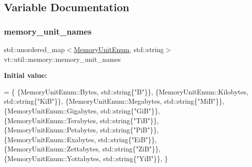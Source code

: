 \subsection{Variable Documentation}
\mbox{\label{namespacevt_1_1util_1_1memory_aa772e07fd4860ed4086654c53eed51c2}} 
\subsubsection{\texorpdfstring{memory\+\_\+unit\+\_\+names}{memory\_unit\_names}}
{\footnotesize\ttfamily std\+::unordered\+\_\+map$<$\hyperlink{namespacevt_1_1util_1_1memory_a64df3d84293b34009f78e2a1db2f9bb6}{Memory\+Unit\+Enum}, std\+::string$>$ vt\+::util\+::memory\+::memory\+\_\+unit\+\_\+names}

{\bfseries Initial value\+:}
\begin{DoxyCode}
= \{
  \{MemoryUnitEnum::Bytes,      std::string\{\textcolor{stringliteral}{"B"}\}\},
  \{MemoryUnitEnum::Kilobytes,  std::string\{\textcolor{stringliteral}{"KiB"}\}\},
  \{MemoryUnitEnum::Megabytes,  std::string\{\textcolor{stringliteral}{"MiB"}\}\},
  \{MemoryUnitEnum::Gigabytes,  std::string\{\textcolor{stringliteral}{"GiB"}\}\},
  \{MemoryUnitEnum::Terabytes,  std::string\{\textcolor{stringliteral}{"TiB"}\}\},
  \{MemoryUnitEnum::Petabytes,  std::string\{\textcolor{stringliteral}{"PiB"}\}\},
  \{MemoryUnitEnum::Exabytes,   std::string\{\textcolor{stringliteral}{"EiB"}\}\},
  \{MemoryUnitEnum::Zettabytes, std::string\{\textcolor{stringliteral}{"ZiB"}\}\},
  \{MemoryUnitEnum::Yottabytes, std::string\{\textcolor{stringliteral}{"YiB"}\}\},
\}
\end{DoxyCode}
